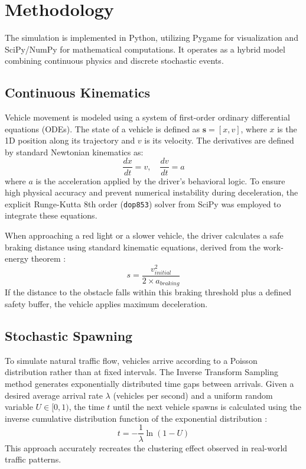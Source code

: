 \documentclass[12pt, letterpaper, twoside]{article}
\begin{document}
\section{Methodology}
\label{sec:method}
The simulation is implemented in Python, utilizing Pygame for visualization and SciPy/NumPy for mathematical computations. It operates as a hybrid model combining continuous physics and discrete stochastic events.

\subsection{Continuous Kinematics}
Vehicle movement is modeled using a system of first-order ordinary differential equations (ODEs). The state of a vehicle is defined as $\mathbf{s} = [x, v]$, where $x$ is the 1D position along its trajectory and $v$ is its velocity. The derivatives are defined by standard Newtonian kinematics \cite{halliday2013fundamentals} as:
\begin{equation}
    \frac{dx}{dt} = v, \quad \frac{dv}{dt} = a
\end{equation}
where $a$ is the acceleration applied by the driver's behavioral logic. To ensure high physical accuracy and prevent numerical instability during deceleration, the explicit Runge-Kutta 8th order (\texttt{dop853}) solver from SciPy was employed to integrate these equations.

When approaching a red light or a slower vehicle, the driver calculates a safe braking distance using standard kinematic equations, derived from the work-energy theorem \cite{halliday2013fundamentals}:
\begin{equation}
    s = \frac{v_{initial}^2}{2 \times a_{braking}}
\end{equation}
If the distance to the obstacle falls within this braking threshold plus a defined safety buffer, the vehicle applies maximum deceleration.

\subsection{Stochastic Spawning}
To simulate natural traffic flow, vehicles arrive according to a Poisson distribution rather than at fixed intervals. The Inverse Transform Sampling method generates exponentially distributed time gaps between arrivals. Given a desired average arrival rate $\lambda$ (vehicles per second) and a uniform random variable $U \in [0, 1)$, the time $t$ until the next vehicle spawns is calculated using the inverse cumulative distribution function of the exponential distribution \cite{ross2012simulation}:
\begin{equation}
    t = -\frac{1}{\lambda} \ln(1 - U)
\end{equation}
This approach accurately recreates the clustering effect observed in real-world traffic patterns.
\end{document}
